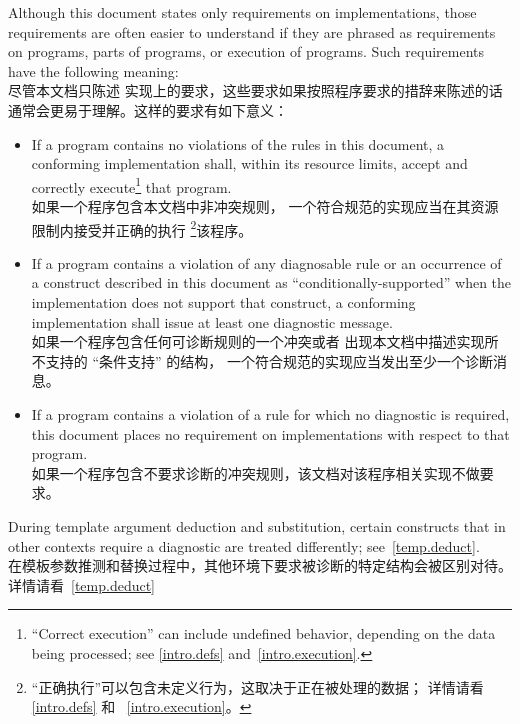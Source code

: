 \pnum
{}%
Although this document states only requirements on \Cpp{}
implementations, those requirements are often easier to understand if
they are phrased as requirements on programs, parts of programs, or
execution of programs. Such requirements have the following meaning: \\
尽管本文档只陈述 \Cpp{} 实现上的要求，这些要求如果按照程序要求的措辞来陈述的话
通常会更易于理解。这样的要求有如下意义：
\begin{itemize}
\item
If a program contains no violations of the rules in this
document, a conforming implementation shall,
within its resource limits, accept and correctly execute\footnote{``Correct execution'' can include undefined behavior, depending on
the data being processed; see \ref{intro.defs} and~\ref{intro.execution}.}
that program. \\
如果一个程序包含本文档中非冲突规则，
一个符合规范的实现应当在其资源限制内接受并正确的执行
\footnote{
    ``正确执行''可以包含未定义行为，这取决于正在被处理的数据；
    详情请看 \ref{intro.defs} 和 ~\ref{intro.execution}。
}该程序。
\item
{}%
If a program contains a violation of any diagnosable rule or an occurrence
of a construct described in this document as ``conditionally-supported'' when
the implementation does not support that construct, a conforming implementation
shall issue at least one diagnostic message. \\
如果一个程序包含任何可诊断规则的一个冲突或者
出现本文档中描述实现所不支持的 ``条件支持'' 的结构，
一个符合规范的实现应当发出至少一个诊断消息。
\item
{}%
If a program contains a violation of a rule for which no diagnostic
is required, this document places no requirement on
implementations with respect to that program. \\
如果一个程序包含不要求诊断的冲突规则，该文档对该程序相关实现不做要求。
\end{itemize}
\begin{note}
During template argument deduction and substitution,
certain constructs that in other contexts require a diagnostic
are treated differently;
see~\ref{temp.deduct}. \\
在模板参数推测和替换过程中，其他环境下要求被诊断的特定结构会被区别对待。
详情请看~\ref{temp.deduct}
\end{note}

